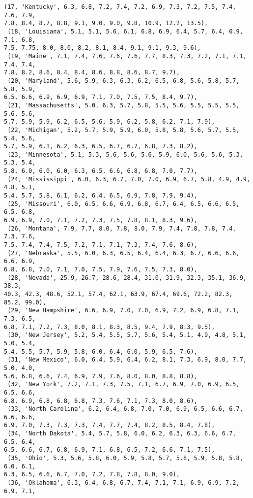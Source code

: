 \documentclass[11pt]{article}
\begin{document}
\begin{tcolorbox}[breakable, size=fbox, boxrule=.5pt, pad at break*=1mm, opacityfill=0]
\begin{Verbatim}[commandchars=\\\{\}]
 (17, 'Kentucky', 6.3, 6.8, 7.2, 7.4, 7.2, 6.9, 7.3, 7.2, 7.5, 7.4, 7.6, 7.9,
7.8, 8.4, 8.7, 8.8, 9.1, 9.0, 9.0, 9.8, 10.9, 12.2, 13.5),
 (18, 'Louisiana', 5.1, 5.1, 5.6, 6.1, 6.8, 6.9, 6.4, 5.7, 6.4, 6.9, 7.1, 6.8,
7.5, 7.75, 8.0, 8.0, 8.2, 8.1, 8.4, 9.1, 9.1, 9.3, 9.6),
 (19, 'Maine', 7.1, 7.4, 7.6, 7.6, 7.6, 7.7, 8.3, 7.3, 7.2, 7.1, 7.1, 7.4, 7.4,
7.8, 8.2, 8.6, 8.4, 8.4, 8.6, 8.8, 8.6, 8.7, 9.7),
 (20, 'Maryland', 5.6, 5.9, 6.3, 6.3, 6.2, 6.5, 6.8, 5.6, 5.8, 5.7, 5.8, 5.9,
6.5, 6.6, 6.9, 6.9, 6.9, 7.1, 7.0, 7.5, 7.5, 8.4, 9.7),
 (21, 'Massachusetts', 5.0, 6.3, 5.7, 5.8, 5.5, 5.6, 5.5, 5.5, 5.5, 5.6, 5.6,
5.7, 5.9, 5.9, 6.2, 6.5, 5.6, 5.9, 6.2, 5.8, 6.2, 7.1, 7.9),
 (22, 'Michigan', 5.2, 5.7, 5.9, 5.9, 6.0, 5.8, 5.8, 5.6, 5.7, 5.5, 5.4, 5.6,
5.7, 5.9, 6.1, 6.2, 6.3, 6.5, 6.7, 6.7, 6.8, 7.3, 8.2),
 (23, 'Minnesota', 5.1, 5.3, 5.6, 5.6, 5.6, 5.9, 6.0, 5.6, 5.6, 5.3, 5.3, 5.4,
5.8, 6.0, 6.0, 6.0, 6.3, 6.5, 6.6, 6.8, 6.8, 7.0, 7.7),
 (24, 'Mississippi', 6.0, 6.3, 6.7, 7.0, 7.0, 6.9, 6.7, 5.8, 4.9, 4.9, 4.8, 5.1,
5.4, 5.7, 5.8, 6.1, 6.2, 6.4, 6.5, 6.9, 7.8, 7.9, 9.4),
 (25, 'Missouri', 6.0, 6.5, 6.6, 6.9, 6.8, 6.7, 6.4, 6.5, 6.6, 6.5, 6.5, 6.8,
6.9, 6.9, 7.0, 7.1, 7.2, 7.3, 7.5, 7.8, 8.1, 8.3, 9.6),
 (26, 'Montana', 7.9, 7.7, 8.0, 7.8, 8.0, 7.9, 7.4, 7.8, 7.8, 7.4, 7.3, 7.6,
7.5, 7.4, 7.4, 7.5, 7.2, 7.1, 7.1, 7.3, 7.4, 7.6, 8.6),
 (27, 'Nebraska', 5.5, 6.0, 6.3, 6.5, 6.4, 6.4, 6.3, 6.7, 6.6, 6.6, 6.6, 6.9,
6.8, 6.8, 7.0, 7.1, 7.0, 7.5, 7.9, 7.6, 7.5, 7.3, 8.0),
 (28, 'Nevada', 25.9, 26.7, 28.6, 28.4, 31.0, 31.9, 32.3, 35.1, 36.9, 38.3,
40.3, 42.3, 48.6, 52.1, 57.4, 62.1, 63.9, 67.4, 69.6, 72.2, 82.3, 85.2, 99.0),
 (29, 'New Hampshire', 6.6, 6.9, 7.0, 7.0, 6.9, 7.2, 6.9, 6.8, 7.1, 7.3, 6.5,
6.8, 7.1, 7.2, 7.3, 8.0, 8.1, 8.3, 8.5, 9.4, 7.9, 8.3, 9.5),
 (30, 'New Jersey', 5.2, 5.4, 5.5, 5.7, 5.6, 5.4, 5.1, 4.9, 4.8, 5.1, 5.0, 5.4,
5.4, 5.5, 5.7, 5.9, 5.8, 6.0, 6.4, 6.0, 5.9, 6.5, 7.6),
 (31, 'New Mexico', 6.0, 6.4, 5.9, 6.4, 6.2, 8.1, 7.3, 6.9, 8.0, 7.7, 5.0, 4.0,
5.6, 6.8, 6.6, 7.4, 6.9, 7.9, 7.6, 8.0, 8.0, 8.8, 8.8),
 (32, 'New York', 7.2, 7.1, 7.3, 7.5, 7.1, 6.7, 6.9, 7.0, 6.9, 6.5, 6.5, 6.6,
6.8, 6.9, 6.8, 6.8, 6.8, 7.3, 7.6, 7.1, 7.3, 8.0, 8.6),
 (33, 'North Carolina', 6.2, 6.4, 6.8, 7.0, 7.0, 6.9, 6.5, 6.6, 6.7, 6.6, 6.6,
6.9, 7.0, 7.3, 7.3, 7.3, 7.4, 7.7, 7.4, 8.2, 8.5, 8.4, 7.8),
 (34, 'North Dakota', 5.4, 5.7, 5.8, 6.0, 6.2, 6.3, 6.3, 6.6, 6.7, 6.5, 6.4,
6.5, 6.6, 6.7, 6.8, 6.9, 7.1, 6.8, 6.5, 7.2, 6.6, 7.1, 7.5),
 (35, 'Ohio', 5.3, 5.6, 5.8, 6.0, 5.9, 5.8, 5.7, 5.8, 5.9, 5.8, 5.8, 6.0, 6.1,
6.3, 6.5, 6.6, 6.7, 7.0, 7.2, 7.8, 7.8, 8.0, 9.0),
 (36, 'Oklahoma', 6.3, 6.4, 6.8, 6.7, 7.4, 7.1, 7.1, 6.9, 6.9, 7.2, 6.9, 7.1,

\end{Verbatim}
\end{tcolorbox}
\end{document}
